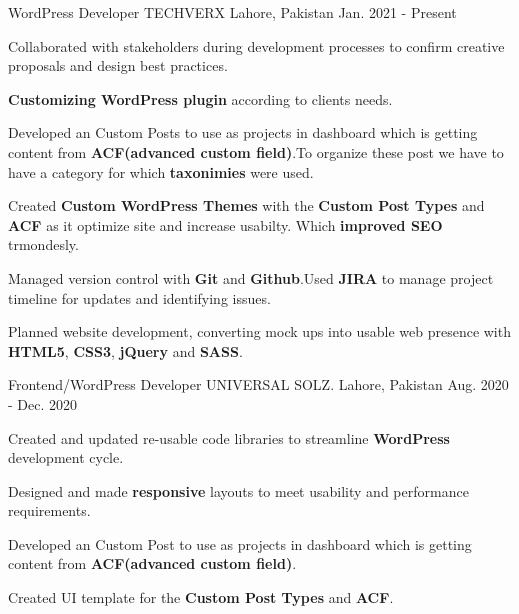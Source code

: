 

\begin{cventries}

  \cventry
    {WordPress Developer} %
    {TECHVERX} %
    {Lahore, Pakistan} %
    {Jan. 2021 - Present} %
    {
      \begin{cvitems} %
        \item {Collaborated with stakeholders during development processes to confirm creative proposals and design best practices.}
        \item {\textbf{Customizing WordPress plugin} according to clients needs.}
        \item {Developed an Custom Posts to use as projects in dashboard which is getting content from \textbf{ACF(advanced custom field)}.To organize these post we have to have a category for which \textbf{taxonimies} were used.}
        \item {Created \textbf{Custom WordPress Themes} with the \textbf{Custom Post Types} and \textbf{ACF} as it optimize site and increase usabilty. Which \textbf{improved SEO} trmondesly.}
        \item {Managed version control with \textbf{Git} and \textbf{Github}.Used \textbf{JIRA} to manage project timeline for updates and identifying issues.}
        \item {Planned website development, converting mock ups into usable web presence with \textbf{HTML5}, \textbf{CSS3}, \textbf{jQuery} and \textbf{SASS}.}
        
      \end{cvitems}
    }

  \cventry
    {Frontend/WordPress Developer} %
    {UNIVERSAL SOLZ.} %
    {Lahore, Pakistan} %
    {Aug. 2020 - Dec. 2020} %
    {
      \begin{cvitems} %
        \item {Created and updated re-usable code libraries to streamline \textbf{WordPress} development cycle.}
        \item {Designed and made \textbf{responsive} layouts to meet usability and performance requirements.}
        \item {Developed an Custom Post to use as projects in dashboard which is getting content from \textbf{ACF(advanced custom field)}.}
        \item {Created UI template for the \textbf{Custom Post Types} and \textbf{ACF}.}
      \end{cvitems}
    }


\end{cventries}
